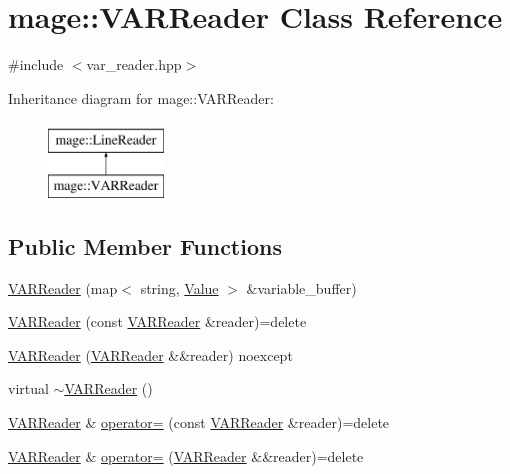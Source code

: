 \hypertarget{classmage_1_1_v_a_r_reader}{}\section{mage\+:\+:V\+A\+R\+Reader Class Reference}
\label{classmage_1_1_v_a_r_reader}


{\ttfamily \#include $<$var\+\_\+reader.\+hpp$>$}

Inheritance diagram for mage\+:\+:V\+A\+R\+Reader\+:\begin{figure}[H]
\begin{center}
\leavevmode
\includegraphics[height=2.000000cm]{classmage_1_1_v_a_r_reader}
\end{center}
\end{figure}
\subsection*{Public Member Functions}
\begin{DoxyCompactItemize}
\item 
\hyperlink{classmage_1_1_v_a_r_reader_a6da616aa299231ef6a61fe8de536a342}{V\+A\+R\+Reader} (map$<$ string, \hyperlink{namespacemage_aa1fe0628487e0706e44efdc62dbdb3a2}{Value} $>$ \&variable\+\_\+buffer)
\item 
\hyperlink{classmage_1_1_v_a_r_reader_a42faf193700b82813727aa943ded3940}{V\+A\+R\+Reader} (const \hyperlink{classmage_1_1_v_a_r_reader}{V\+A\+R\+Reader} \&reader)=delete
\item 
\hyperlink{classmage_1_1_v_a_r_reader_a992526da4076d5ef0b33400a4ff26cfa}{V\+A\+R\+Reader} (\hyperlink{classmage_1_1_v_a_r_reader}{V\+A\+R\+Reader} \&\&reader) noexcept
\item 
virtual \hyperlink{classmage_1_1_v_a_r_reader_ad6d33cedc71285380eeda74e45e4a1d2}{$\sim$\+V\+A\+R\+Reader} ()
\item 
\hyperlink{classmage_1_1_v_a_r_reader}{V\+A\+R\+Reader} \& \hyperlink{classmage_1_1_v_a_r_reader_a8ea4a08a1d66a8d177ac6e30ef13722c}{operator=} (const \hyperlink{classmage_1_1_v_a_r_reader}{V\+A\+R\+Reader} \&reader)=delete
\item 
\hyperlink{classmage_1_1_v_a_r_reader}{V\+A\+R\+Reader} \& \hyperlink{classmage_1_1_v_a_r_reader_a7cf3c6fe1e27377d4a6ea914a11bc382}{operator=} (\hyperlink{classmage_1_1_v_a_r_reader}{V\+A\+R\+Reader} \&\&reader)=delete
\end{DoxyCompactItemize}

